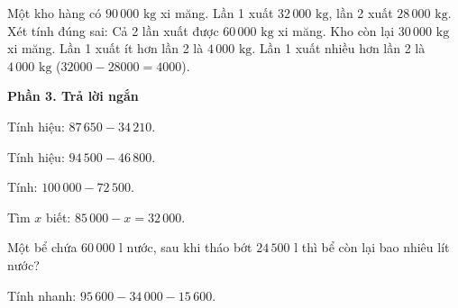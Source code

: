 \begin{ex} %
Một kho hàng có $90\,000\text{ kg}$ xi măng. Lần 1 xuất $32\,000\text{ kg}$, lần 2 xuất $28\,000\text{ kg}$. Xét tính đúng sai:
\choiceTF
{\True Cả 2 lần xuất được $60\,000\text{ kg}$ xi măng.}
{\True Kho còn lại $30\,000\text{ kg}$ xi măng.}
{Lần 1 xuất ít hơn lần 2 là $4\,000\text{ kg}$.}
{\True Lần 1 xuất nhiều hơn lần 2 là $4\,000\text{ kg}$ ($32000 - 28000 = 4000$).}
\end{ex}

\textbf{Phần 3. Trả lời ngắn}

\begin{ex} %
Tính hiệu: $87\,650 - 34\,210$.
\end{ex}

\begin{ex} %
Tính hiệu: $94\,500 - 46\,800$.
\end{ex}

\begin{ex} %
Tính: $100\,000 - 72\,500$.
\end{ex}

\begin{ex} %
Tìm $x$ biết: $85\,000 - x = 32\,000$.
\end{ex}

\begin{ex} %
Một bể chứa $60\,000\text{ l}$ nước, sau khi tháo bớt $24\,500\text{ l}$ thì bể còn lại bao nhiêu lít nước?
\end{ex}

\begin{ex} %
Tính nhanh: $95\,600 - 34\,000 - 15\,600$.
\end{ex}
